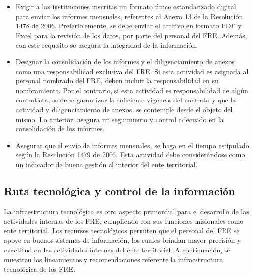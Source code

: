 \documentclass[
]{book}
\begin{document}
\begin{itemize}
\item
  Exigir a las instituciones inscritas un formato único estandarizado digital para enviar los informes mensuales, referentes al Anexo 13 de la Resolución 1478 de 2006. Preferiblemente, se debe enviar el archivo en formato PDF y Excel para la revisión de los datos, por parte del personal del FRE. Además, con este requisito se asegura la integridad de la información.
\item
  Designar la consolidación de los informes y el diligenciamiento de anexos como una responsabilidad exclusiva del FRE. Si esta actividad es asignada al personal nombrado del FRE, deben incluir la responsabilidad en su nombramiento. Por el contrario, si esta actividad es responsabilidad de algún contratista, se debe garantizar la suficiente vigencia del contrato y que la actividad y diligenciamiento de anexos, se contemple desde el objeto del mismo. Lo anterior, asegura un seguimiento y control adecuado en la consolidación de los informes.
\item
  Asegurar que el envío de informes mensuales, se haga en el tiempo estipulado según la Resolución 1479 de 2006. Esta actividad debe considerándose como un indicador de buena gestión al interior del ente territorial.
\end{itemize}

\hypertarget{ruta-tecnoluxf3gica-y-control-de-la-informaciuxf3n}{%
\subsection{Ruta tecnológica y control de la información}\label{ruta-tecnoluxf3gica-y-control-de-la-informaciuxf3n}}

La infraestructura tecnológica es otro aspecto primordial para el desarrollo de las actividades internas de los FRE, cumpliendo con sus funciones misionales como ente territorial. Los recursos tecnológicos permiten que el personal del FRE se apoye en buenos sistemas de información, los cuales brindan mayor precisión y exactitud en las actividades internas del ente territorial. A continuación, se muestran los lineamientos y recomendaciones referente la infraestructura tecnológica de los FRE:
\end{document}
